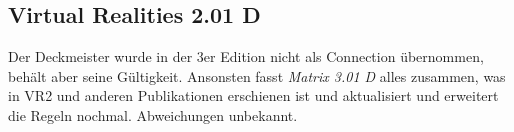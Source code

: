 \documentclass[a4paper]{scrartcl}
\begin{document}
\subsection{Virtual Realities 2.01 D}
Der Deckmeister wurde in der 3er Edition nicht als Connection übernommen, behält aber seine Gültigkeit. Ansonsten fasst \textit{Matrix 3.01 D} alles zusammen, was in VR2 und anderen Publikationen erschienen ist und aktualisiert und erweitert die Regeln nochmal. Abweichungen unbekannt.
\end{document}

